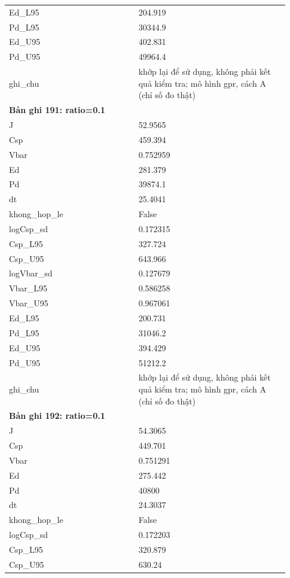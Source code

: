 \begin{longtable}{p{0.43\linewidth}p{0.50\linewidth}}
Ed\_\allowbreak L95 & 204.919 \\
Pd\_\allowbreak L95 & 30344.9 \\
Ed\_\allowbreak U95 & 402.831 \\
Pd\_\allowbreak U95 & 49964.4 \\
ghi\_\allowbreak chu & khớp lại để sử dụng, không phải kết quả kiểm tra; mô hình gpr, cách A (chỉ số đo thật) \\
\midrule
\multicolumn{2}{p{0.95\linewidth}}{\textbf{Bản ghi 191: ratio=0.1}} \\
J & 52.9565 \\
Csp & 459.394 \\
Vbar & 0.752959 \\
Ed & 281.379 \\
Pd & 39874.1 \\
dt & 25.4041 \\
khong\_\allowbreak hop\_\allowbreak le & False \\
logCsp\_\allowbreak sd & 0.172315 \\
Csp\_\allowbreak L95 & 327.724 \\
Csp\_\allowbreak U95 & 643.966 \\
logVbar\_\allowbreak sd & 0.127679 \\
Vbar\_\allowbreak L95 & 0.586258 \\
Vbar\_\allowbreak U95 & 0.967061 \\
Ed\_\allowbreak L95 & 200.731 \\
Pd\_\allowbreak L95 & 31046.2 \\
Ed\_\allowbreak U95 & 394.429 \\
Pd\_\allowbreak U95 & 51212.2 \\
ghi\_\allowbreak chu & khớp lại để sử dụng, không phải kết quả kiểm tra; mô hình gpr, cách A (chỉ số đo thật) \\
\midrule
\multicolumn{2}{p{0.95\linewidth}}{\textbf{Bản ghi 192: ratio=0.1}} \\
J & 54.3065 \\
Csp & 449.701 \\
Vbar & 0.751291 \\
Ed & 275.442 \\
Pd & 40800 \\
dt & 24.3037 \\
khong\_\allowbreak hop\_\allowbreak le & False \\
logCsp\_\allowbreak sd & 0.172203 \\
Csp\_\allowbreak L95 & 320.879 \\
Csp\_\allowbreak U95 & 630.24 \\

\end{longtable}
